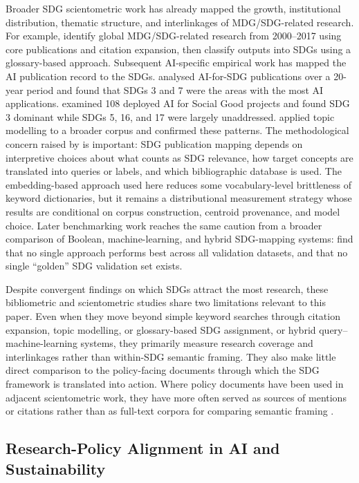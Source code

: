 \documentclass[12pt,a4paper]{article}
\begin{document}
Broader SDG scientometric work has already mapped the growth, institutional distribution, thematic structure, and interlinkages of MDG/SDG-related research. For example, \textcite{BautistaPuig2021} identify global MDG/SDG-related research from 2000--2017 using core publications and citation expansion, then classify outputs into SDGs using a glossary-based approach. Subsequent AI-specific empirical work has mapped the AI publication record to the SDGs. \textcite{Singh2024} analysed AI-for-SDG publications over a 20-year period and found that SDGs 3 and 7 were the areas with the most AI applications. \textcite{Cowls2021} examined 108 deployed AI for Social Good projects and found SDG 3 dominant while SDGs 5, 16, and 17 were largely unaddressed. \textcite{Nedungadi2024} applied topic modelling to a broader corpus and confirmed these patterns. The methodological concern raised by \textcite{Armitage2020} is important: SDG publication mapping depends on interpretive choices about what counts as SDG relevance, how target concepts are translated into queries or labels, and which bibliographic database is used. The embedding-based approach used here reduces some vocabulary-level brittleness of keyword dictionaries, but it remains a distributional measurement strategy whose results are conditional on corpus construction, centroid provenance, and model choice. Later benchmarking work reaches the same caution from a broader comparison of Boolean, machine-learning, and hybrid SDG-mapping systems: \textcite{Kashnitsky2024} find that no single approach performs best across all validation datasets, and that no single ``golden'' SDG validation set exists.

Despite convergent findings on which SDGs attract the most research, these bibliometric and scientometric studies share two limitations relevant to this paper. Even when they move beyond simple keyword searches through citation expansion, topic modelling, or glossary-based SDG assignment, or hybrid query--machine-learning systems, they primarily measure research coverage and interlinkages rather than within-SDG semantic framing. They also make little direct comparison to the policy-facing documents through which the SDG framework is translated into action. Where policy documents have been used in adjacent scientometric work, they have more often served as sources of mentions or citations rather than as full-text corpora for comparing semantic framing \parencite{bornmann2016policy}.

\subsection{Research-Policy Alignment in AI and Sustainability}
\end{document}
